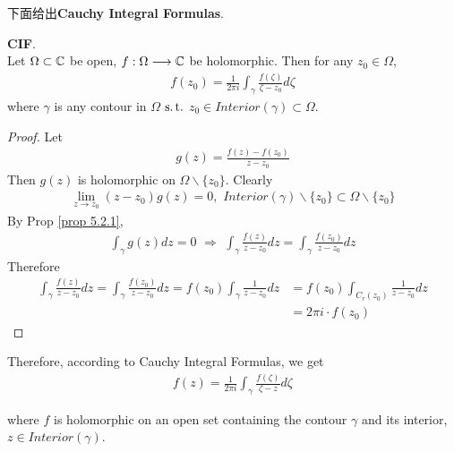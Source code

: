 \newpage
下面给出\textbf{Cauchy Integral Formulas}.
\begin{thm}\label{thm 5.2.1}
	\textbf{CIF}.\\
	Let $\Omega \subset \mathbb{C}$ be open, $f : \Omega \longrightarrow \mathbb{C}$ be holomorphic. Then for any $z_0 \in \Omega$,
	\begin{align}
		f(z_0) = \frac{1}{2 \pi i} \int_{\gamma}{\frac{f(\zeta)}{\zeta - z_0} d\zeta}
	\end{align}
	where $\gamma$ is any contour in $\Omega$ $\operatorname{s.t.}$ $z_0 \in Interior(\gamma) \subset \Omega$.
	
	\vspace{2em}
	\begin{proof}
		Let
		\begin{align}
			g(z) = \frac{f(z) - f(z_0)}{z - z_0}
		\end{align}
		Then $g(z)$ is holomorphic on $\Omega \backslash \{ z_0 \}$. Clearly
		\begin{align}
			\lim_{z \to z_0}{(z - z_0) g(z)} = 0 , \,\, Interior(\gamma) \backslash \{ z_0 \} \subset \Omega \backslash \{ z_0 \}
		\end{align}
		By Prop \ref{prop 5.2.1},
		\begin{align}
			\int_{\gamma}{g(z) dz} = 0 \,\, \Rightarrow \,\, \int_{\gamma}{\frac{f(z)}{z - z_0} dz} = \int_{\gamma}{\frac{f(z_0)}{z - z_0} dz}
		\end{align}
		Therefore
		\begin{align}
			\int_{\gamma}{\frac{f(z)}{z - z_0} dz} 
			= \int_{\gamma}{\frac{f(z_0)}{z - z_0} dz} 
			= f(z_0) \int_{\gamma}{\frac{1}{z - z_0} dz} 
			&= f(z_0) \int_{C_{r}(z_0)}{\frac{1}{z - z_0} dz} \\
			&= 2 \pi i \cdot f(z_0)
		\end{align}
	\end{proof}
\end{thm}

\vspace{2em}
Therefore, according to Cauchy Integral Formulas, we get
\begin{align}
	f(z) = \frac{1}{2 \pi i} \int_{\gamma}{\frac{f(\zeta)}{\zeta - z} d\zeta} 
\end{align}
\begin{center}
	where $f$ is holomorphic on an open set containing the contour $\gamma$ and its interior, $z \in Interior(\gamma)$.
\end{center}

\newpage
